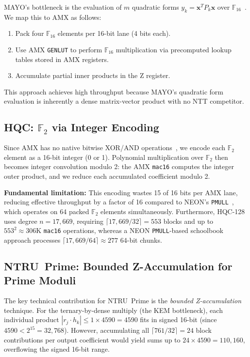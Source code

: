 \documentclass[utf8]{FrontiersinHarvard}
\begin{document}
MAYO's bottleneck is the evaluation of $m$ quadratic forms $y_k = \mathbf{x}^T P_k \mathbf{x}$ over $\mathbb{F}_{16}$~\cite{beullens2022mayo}. We map this to AMX as follows:

\begin{enumerate}
  \item Pack four $\mathbb{F}_{16}$ elements per 16-bit lane (4 bits each).
  \item Use AMX \texttt{GENLUT} to perform $\mathbb{F}_{16}$ multiplication via precomputed lookup tables stored in AMX registers.
  \item Accumulate partial inner products in the Z register.
\end{enumerate}

This approach achieves high throughput because MAYO's quadratic form evaluation is inherently a dense matrix-vector product with no NTT competitor.

\subsection{HQC: $\mathbb{F}_2$ via Integer Encoding}

Since AMX has no native bitwise XOR/AND operations~\cite{corsix2022amx}, we encode each $\mathbb{F}_2$ element as a 16-bit integer (0 or 1). Polynomial multiplication over $\mathbb{F}_2$ then becomes integer convolution modulo 2: the AMX \texttt{mac16} computes the integer outer product, and we reduce each accumulated coefficient modulo 2.

\textbf{Fundamental limitation:} This encoding wastes 15 of 16 bits per AMX lane, reducing effective throughput by a factor of 16 compared to NEON's \texttt{PMULL}~\cite{arm2021neon}, which operates on 64 packed $\mathbb{F}_2$ elements simultaneously. Furthermore, HQC-128 uses degree $n = 17{,}669$, requiring $\lceil 17{,}669/32 \rceil = 553$ blocks and up to $553^2 \approx 306\text{K}$ \texttt{mac16} operations, whereas a NEON \texttt{PMULL}-based schoolbook approach processes $\lceil 17{,}669 / 64 \rceil \approx 277$ 64-bit chunks.

\subsection{NTRU~Prime: Bounded Z-Accumulation for Prime Moduli}

The key technical contribution for NTRU~Prime is the \emph{bounded Z-accumulation} technique. For the ternary-by-dense multiply (the KEM bottleneck), each individual product $|r_j \cdot h_k| \leq 1 \times 4590 = 4590$ fits in signed 16-bit (since $4590 < 2^{15} = 32{,}768$). However, accumulating all $\lceil 761/32 \rceil = 24$ block contributions per output coefficient would yield sums up to $24 \times 4590 = 110{,}160$, overflowing the signed 16-bit range.
\end{document}

